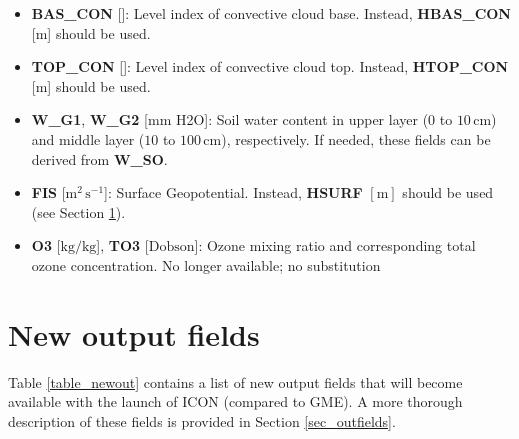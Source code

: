 \begin{itemize}
 \item \textbf{BAS\_CON} [\textendash]: Level index of convective cloud base. Instead, \textbf{HBAS\_CON} [m] should be used.
 \item \textbf{TOP\_CON} [\textendash]: Level index of convective cloud top. Instead, \textbf{HTOP\_CON} [m] should be used.
 \item \textbf{W\_G1}, \textbf{W\_G2}  [mm H2O]: Soil water content in upper layer ($0$ to $10\,\mathrm{cm}$) and middle layer ($10$ to $100\,\mathrm{cm}$), respectively. 
                                                 If needed, these fields can be derived from \textbf{W\_SO}.
 \item \textbf{FIS} [$\mathrm{m^{2}\,s^{-1}}$]: Surface Geopotential. Instead, \textbf{HSURF} $[\mathrm{m}]$ should be used (see Section \ref{sec_newout}).
 \item \textbf{O3} [$\mathrm{kg/kg}$], \textbf{TO3} [$\mathrm{Dobson}$]: Ozone mixing ratio and corresponding total ozone concentration. No longer available; no substitution
\end{itemize}



\section{New output fields}\label{sec_newout}

Table \ref{table_newout} contains a list of new output fields that will become available with the launch of ICON (compared to GME). A more thorough description of these 
fields is provided in Section \ref{sec_outfields}.

